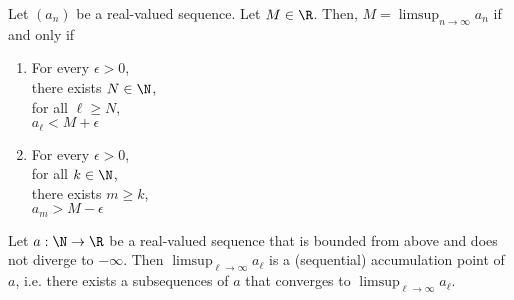 \begin{myCenter}
\end{myCenter}
\begin{proposition}
    Let $(a_n)$ be a real-valued sequence. Let $M \in \R$. Then, $M = \limsup_{n\to\infty}a_n$ if and only if
    \begin{enumerate}[label=\roman*.]
        \item 
            \begin{center}
                \parbox{\linewidth}{%
                    \linewidth
                    For every $\epsilon > 0$, \\
                    \hspace*{1em} there exists $N \in \N$, \\
                    \hspace*{2em} for all $\ell \ge N$, \\
                    \hspace*{3em} $a_\ell < M + \epsilon$
                }
            \end{center}
        \item 
            \begin{center}
                \parbox{\linewidth}{
                    \linewidth
                    For every $\epsilon > 0$, \\
                    \hspace*{1em} for all $k \in \N$, \\
                    \hspace*{2em} there exists $m \ge k$, \\
                    \hspace*{3em} $a_m > M - \epsilon$ \\
                }
            \end{center}
    \end{enumerate}
\end{proposition}

\begin{theorem}
    Let $a: \N \to \R$ be a real-valued sequence that is bounded from above and does not diverge to $-\infty$. Then
    $\limsup_{\ell \to \infty}a_\ell$ is a (sequential) accumulation point of $a$, i.e. there exists a subsequences of $a$ that converges to $\limsup_{\ell \to \infty}a_\ell$.
\end{theorem}

